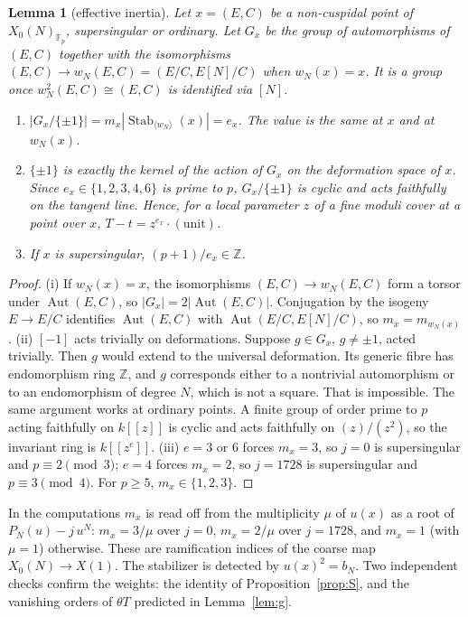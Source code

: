 \documentclass[11pt,a4paper]{article}
\numberwithin{equation}{section}
\newtheorem{lemma}[theorem]{Lemma}
\theoremstyle{definition}
\theoremstyle{remark}
\newcommand{\Fb}{\overline{\mathbb F}_p}
\newcommand{\Z}{\mathbb Z}
\newcommand{\Aut}{\operatorname{Aut}}
\newcommand{\Stab}{\operatorname{Stab}}
\begin{document}
\begin{lemma}[effective inertia]\label{lem:inertia}
Let $x=(E,C)$ be a non-cuspidal point of $X_0(N)_{\Fb}$, supersingular or ordinary. Let $G_x$ be the group of automorphisms
of $(E,C)$ together with the isomorphisms $(E,C)\to w_N(E,C)=(E/C,E[N]/C)$ when $w_N(x)=x$. It is a group once
$w_N^2(E,C)\cong(E,C)$ is identified via $[N]$.
\begin{enumerate}[label=\textup{(\roman*)}]
\item $|G_x/\{\pm1\}|=m_x|\Stab_{\langle w_N\rangle}(x)|=e_x$. The value is the same at $x$ and at $w_N(x)$.
\item $\{\pm1\}$ is exactly the kernel of the action of $G_x$ on the deformation space of $x$. Since
$e_x\in\{1,2,3,4,6\}$ is prime to $p$, $G_x/\{\pm1\}$ is cyclic and acts faithfully on the tangent line.
Hence, for a local parameter $z$ of a fine moduli cover at a point over $x$, $T-t=z^{e_x}\cdot(\text{unit})$.
\item If $x$ is supersingular, $(p+1)/e_x\in\Z$.
\end{enumerate}
\end{lemma}
\begin{proof}
(i) If $w_N(x)=x$, the isomorphisms $(E,C)\to w_N(E,C)$ form a torsor under $\Aut(E,C)$, so
$|G_x|=2|\Aut(E,C)|$. Conjugation by the isogeny $E\to E/C$ identifies $\Aut(E,C)$ with
$\Aut(E/C,E[N]/C)$, so $m_x=m_{w_N(x)}$.
(ii) $[-1]$ acts trivially on deformations. Suppose $g\in G_x$, $g\ne\pm1$, acted trivially. Then $g$
would extend to the universal deformation. Its generic fibre has endomorphism ring $\Z$, and $g$
corresponds either to a nontrivial automorphism or to an endomorphism of degree $N$, which is not a square.
That is impossible. The same argument works at ordinary points. A finite group of order prime to $p$ acting faithfully on $k[[z]]$ is cyclic and
acts faithfully on $(z)/(z^2)$, so the invariant ring is $k[[z^{e}]]$.
(iii) $e=3$ or $6$ forces $m_x=3$, so $j=0$ is supersingular and $p\equiv2\pmod3$; $e=4$ forces
$m_x=2$, so $j=1728$ is supersingular and $p\equiv3\pmod4$. For $p\ge5$, $m_x\in\{1,2,3\}$.
\end{proof}

In the computations $m_x$ is read off from the multiplicity $\mu$ of $u(x)$ as a root of
$P_N(u)-j\,u^N$: $m_x=3/\mu$ over $j=0$, $m_x=2/\mu$ over $j=1728$, and $m_x=1$ (with $\mu=1$) otherwise.
These are ramification indices of the coarse map $X_0(N)\to X(1)$. The stabilizer is detected by
$u(x)^2=b_N$. Two independent checks confirm the weights: the identity of
Proposition~\ref{prop:S}, and the vanishing orders of $\theta T$ predicted in
Lemma~\ref{lem:g}.
\end{document}
